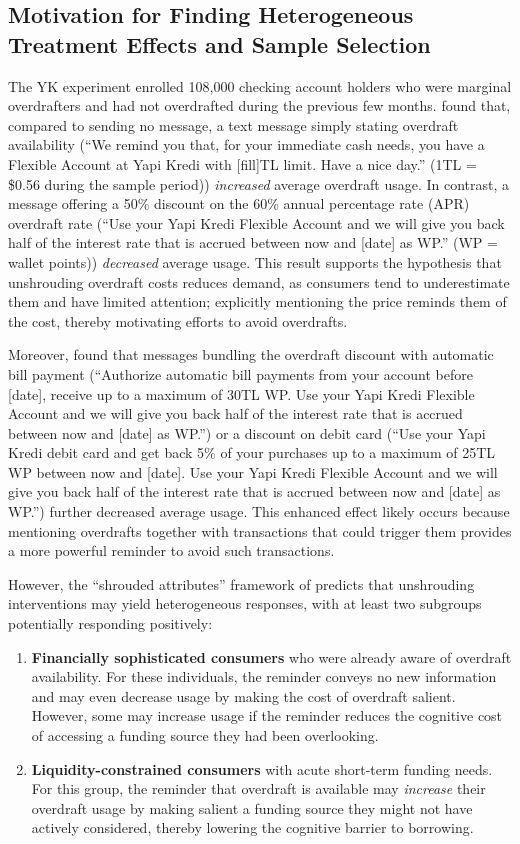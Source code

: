 \documentclass[12pt]{article}
\begin{document}
\subsection{Motivation for Finding Heterogeneous Treatment Effects and Sample Selection}

The YK experiment enrolled 108,000 checking account holders who were marginal overdrafters and had not overdrafted during the previous few months. \citet{alan2018} found that, compared to sending no message, a text message simply stating overdraft availability (``We remind you that, for your immediate cash needs, you have a Flexible Account at Yapi Kredi with [fill]TL limit. Have a nice day.'' (1TL = \$0.56 during the sample period)) \emph{increased} average overdraft usage. In contrast, a message offering a 50{\%} discount on the 60{\%} annual percentage rate (APR) overdraft rate (``Use your Yapi Kredi Flexible Account and we will give you back half of the interest rate that is accrued between now and [date] as WP.'' (WP = wallet points)) \emph{decreased} average usage. This result supports the hypothesis that unshrouding overdraft costs reduces demand, as consumers tend to underestimate them and have limited attention; explicitly mentioning the price reminds them of the cost, thereby motivating efforts to avoid overdrafts.

Moreover, \citet{alan2018} found that messages bundling the overdraft discount with automatic bill payment (``Authorize automatic bill payments from your account before [date], receive up to a maximum of 30TL WP. Use your Yapi Kredi Flexible Account and we will give you back half of the interest rate that is accrued between now and [date] as WP.'') or a discount on debit card (``Use your Yapi Kredi debit card and get back 5{\%} of your purchases up to a maximum of 25TL WP between now and [date]. Use your Yapi Kredi Flexible Account and we will give you back half of the interest rate that is accrued between now and [date] as WP.'') further decreased average usage. This enhanced effect likely occurs because mentioning overdrafts together with transactions that could trigger them provides a more powerful reminder to avoid such transactions.

However, the ``shrouded attributes'' framework of \citet{gabaix2006} predicts that unshrouding interventions may yield heterogeneous responses, with at least two subgroups potentially responding positively:
\begin{enumerate}
	\item \textbf{Financially sophisticated consumers} who were already aware of overdraft availability. For these individuals, the reminder conveys no new information and may even decrease usage by making the cost of overdraft salient. However, some may increase usage if the reminder reduces the cognitive cost of accessing a funding source they had been overlooking.
	\item \textbf{Liquidity-constrained consumers} with acute short-term funding needs. For this group, the reminder that overdraft is available may \emph{increase} their overdraft usage by making salient a funding source they might not have actively considered, thereby lowering the cognitive barrier to borrowing.
\end{enumerate}
\end{document}
